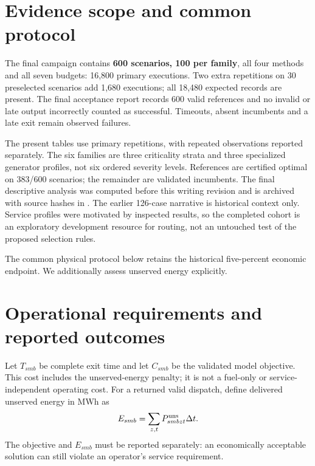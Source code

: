 \section{Evidence scope and common protocol}
The final campaign contains \textbf{600 scenarios, 100 per family}, all four
methods and all seven budgets: 16,800 primary executions. Two extra
repetitions on 30 preselected scenarios add 1,680 executions; all 18,480
expected records are present. The final acceptance report records 600 valid
references and no invalid or late output incorrectly counted as successful.
Timeouts, absent incumbents and a late exit remain observed failures.

The present tables use primary repetitions, with repeated observations
reported separately. The six families are three criticality strata and three
specialized generator profiles, not six ordered severity levels. References
are certified optimal on 383/600 scenarios; the remainder are validated
incumbents. The final descriptive analysis was computed before this writing
revision and is archived with source hashes in
. The earlier 126-case narrative is
historical context only. Service profiles were motivated by inspected results,
so the completed cohort is an exploratory development resource for routing,
not an untouched test of the proposed selection rules.

The common physical protocol below retains the historical five-percent
economic endpoint. We additionally assess unserved energy explicitly.



\section{Operational requirements and reported outcomes}
Let $T_{smb}$ be complete exit time and let $C_{smb}$ be the validated model
objective. This cost includes the unserved-energy penalty; it is not a
fuel-only or service-independent operating cost. For a returned valid dispatch,
define delivered unserved energy in MWh as
\begin{equation}
 E_{smb}=\sum_{z,t}P^{\rm uns}_{smbzt}\Delta t .
 \label{eq:ens}
\end{equation}
The objective and $E_{smb}$ must be reported separately: an economically
acceptable solution can still violate an operator's service requirement.

